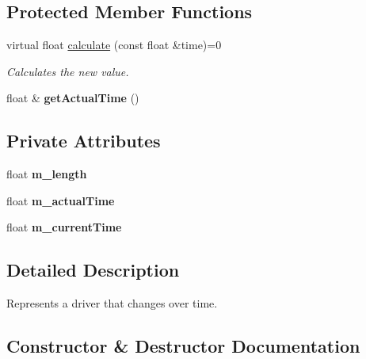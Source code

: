 \subsection*{Protected Member Functions}
\begin{DoxyCompactItemize}
\item 
virtual float \hyperlink{classflounder_1_1idriver_a034c4159dc98c4c37ffdfaae64e4a16d}{calculate} (const float \&time)=0
\begin{DoxyCompactList}\small\item\em Calculates the new value. \end{DoxyCompactList}\item 
\mbox{\label{classflounder_1_1idriver_a9ace6252faea58243061cc0743fa3451}} 
float \& {\bfseries get\+Actual\+Time} ()
\end{DoxyCompactItemize}
\subsection*{Private Attributes}
\begin{DoxyCompactItemize}
\item 
\mbox{\label{classflounder_1_1idriver_a24b0f7c3245fccec35c7bd8475501227}} 
float {\bfseries m\+\_\+length}
\item 
\mbox{\label{classflounder_1_1idriver_a323a95dedeb8e0a2c6e4a0e62268799f}} 
float {\bfseries m\+\_\+actual\+Time}
\item 
\mbox{\label{classflounder_1_1idriver_a8b16f2ff43ceb60aeaf74dc0f137a829}} 
float {\bfseries m\+\_\+current\+Time}
\end{DoxyCompactItemize}


\subsection{Detailed Description}
Represents a driver that changes over time. 



\subsection{Constructor \& Destructor Documentation}
\mbox{\label{classflounder_1_1idriver_a84bafd01e3984ededbb170a5efbad0f0}} 
